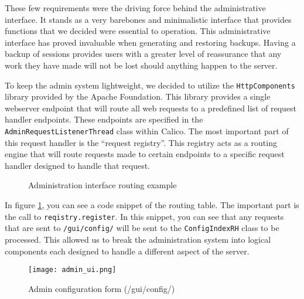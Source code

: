 These few requirements were the driving force behind the administrative interface. It stands as a very barebones and minimalistic interface that provides functions that we decided were essential to operation. This administrative interface has proved invaluable when generating and restoring backups. Having a backup of sessions provides users with a greater level of reassurance that any work they have made will not be lost should anything happen to the server.

% 
To keep the admin system lightweight, we decided to utilize the \texttt{HttpComponents} library provided by the Apache Foundation\cite{apache:http}. This library provides a single webserver endpoint that will route all web requests to a predefined list of request handler endpoints. These endpoints are specified in the \texttt{AdminRequestListenerThread} class within Calico. The most important part of this request handler is the ``request registry''. This registry acts as a routing engine that will route requests made to certain endpoints to a specific request handler designed to handle that request.

\begin{figure}[h!]
  \centering
  \small
  
  \normalsize
  \caption{Administration interface routing example}
  \label{code:request_registry}
\end{figure}

In figure \ref{code:request_registry}, you can see a code snippet of the routing table. The important part is the call to \texttt{reqistry.register}. In this snippet, you can see that any requests that are sent to \texttt{/gui/config/} will be sent to the \texttt{ConfigIndexRH} class to be processed. This allowed us to break the administration system into logical components each designed to handle a different aspect of the server. 

\begin{figure}[h!]
  \centering
  \texttt{[image: admin\_ui.png]}
  \caption{Admin configuration form (/gui/config/)}
  \label{fig:admin_config}
\end{figure}

